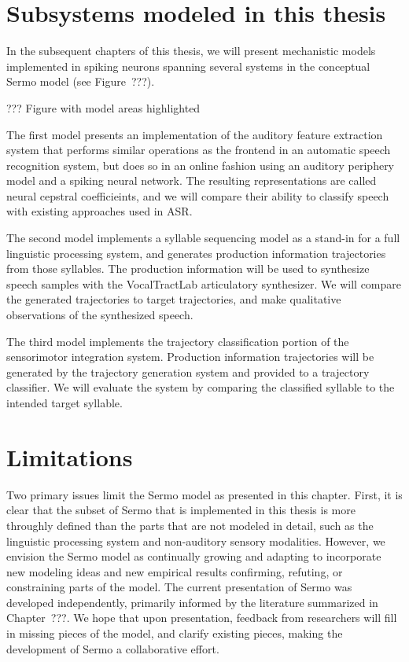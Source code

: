 \section{Subsystems modeled in this thesis}

In the subsequent chapters of this thesis,
we will present mechanistic models
implemented in spiking neurons
spanning several systems
in the conceptual Sermo model
(see Figure~???).

??? Figure with model areas highlighted

The first model presents an implementation
of the auditory feature extraction system
that performs similar operations as
the frontend in an automatic speech recognition system,
but does so in an online fashion
using an auditory periphery model
and a spiking neural network.
The resulting representations are called
neural cepstral coefficieints,
and we will compare their ability
to classify speech with
existing approaches used in ASR.

The second model implements
a syllable sequencing model
as a stand-in for a
full linguistic processing system,
and generates production information trajectories
from those syllables.
The production information will be
used to synthesize speech samples
with the VocalTractLab articulatory synthesizer.
We will compare the generated trajectories
to target trajectories,
and make qualitative observations
of the synthesized speech.

The third model implements
the trajectory classification portion
of the sensorimotor integration system.
Production information trajectories
will be generated
by the trajectory generation system
and provided to a trajectory classifier.
We will evaluate the system by
comparing the classified syllable
to the intended target syllable.


\section{Limitations}

Two primary issues limit the Sermo model
as presented in this chapter.
First, it is clear that the subset of Sermo
that is implemented in this thesis
is more throughly defined than
the parts that are not modeled in detail,
such as the linguistic processing system
and non-auditory sensory modalities.
However, we envision the Sermo model
as continually growing and adapting
to incorporate new modeling ideas
and new empirical results confirming,
refuting, or constraining parts of the model.
The current presentation of Sermo
was developed independently,
primarily informed by the literature
summarized in Chapter~???.
We hope that upon presentation,
feedback from researchers will
fill in missing pieces of the model,
and clarify existing pieces,
making the development of Sermo
a collaborative effort.

